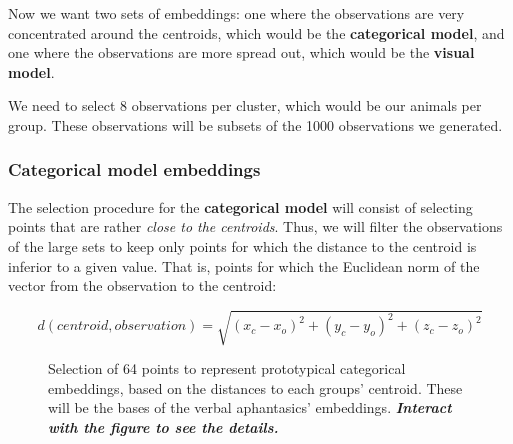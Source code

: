 \documentclass[
  authoryear]{elsarticle}
\begin{document}
Now we want two sets of embeddings: one where the observations are very
concentrated around the centroids, which would be the
\textbf{categorical model}, and one where the observations are more
spread out, which would be the \textbf{visual model}.

We need to select 8 observations per cluster, which would be our animals
per group. These observations will be subsets of the 1000 observations
we generated.

\subsubsection{Categorical model
embeddings}\label{categorical-model-embeddings}

The selection procedure for the \textbf{categorical model} will consist
of selecting points that are rather \emph{close to the centroids}. Thus,
we will filter the observations of the large sets to keep only points
for which the distance to the centroid is inferior to a given value.
That is, points for which the Euclidean norm of the vector from the
observation to the centroid:

\[d(centroid, observation) = \sqrt{(x_{c} - x_{o})^{2} + (y_{c} - y_{o})^{2} + (z_{c} - z_{o})^{2}}\]

\label{cell-fig-categorical-embeddings}
\begin{figure}[H]


\caption{\label{fig-categorical-embeddings}Selection of 64 points to
represent prototypical categorical embeddings, based on the distances to
each groups' centroid. These will be the bases of the verbal
aphantasics' embeddings. \textbf{\emph{Interact with the figure to see
the details.}}}

\end{figure}%
\end{document}

